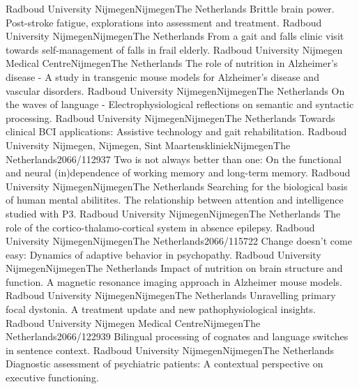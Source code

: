 	{Radboud University Nijmegen}{Nijmegen}{The Netherlands}{}
	{Brittle brain power. Post-stroke fatigue, explorations into assessment and treatment.}
	{Radboud University Nijmegen}{Nijmegen}{The Netherlands}{}
	{From a gait and falls clinic visit towards self-management of falls in frail elderly.}
	{Radboud University Nijmegen Medical Centre}{Nijmegen}{The Netherlands}{}
	{The role of nutrition in Alzheimer's disease - A study in transgenic mouse models for Alzheimer's disease and vascular disorders.}
	{Radboud University Nijmegen}{Nijmegen}{The Netherlands}{}
	{On the waves of language - Electrophysiological reflections on semantic and syntactic processing.}
	{Radboud University Nijmegen}{Nijmegen}{The Netherlands}{}
	{Towards clinical BCI applications: Assistive technology and gait rehabilitation.}
	{Radboud University Nijmegen, Nijmegen, Sint Maartenskliniek}{Nijmegen}{The Netherlands}{2066/112937}
	{Two is not always better than one: On the functional and neural (in)dependence of working memory and long-term memory.}
	{Radboud University Nijmegen}{Nijmegen}{The Netherlands}{}
	{Searching for the biological basis of human mental abilitites. The relationship between attention and intelligence studied with P3.}
	{Radboud University Nijmegen}{Nijmegen}{The Netherlands}{}
	{The role of the cortico-thalamo-cortical system in absence epilepsy.}
	{Radboud University Nijmegen}{Nijmegen}{The Netherlands}{2066/115722}
	{Change doesn’t come easy: Dynamics of adaptive behavior in psychopathy.}
	{Radboud University Nijmegen}{Nijmegen}{The Netherlands}{}
	{ Impact of nutrition on brain structure and function. A magnetic resonance imaging approach in Alzheimer mouse models.}
	{Radboud University Nijmegen}{Nijmegen}{The Netherlands}{}
	{Unravelling primary focal dystonia. A treatment update and new pathophysiological insights.}
	{Radboud University Nijmegen Medical Centre}{Nijmegen}{The Netherlands}{2066/122939}
	{Bilingual processing of cognates and language switches in sentence context.}
	{Radboud University Nijmegen}{Nijmegen}{The Netherlands}{}
	{Diagnostic assessment of psychiatric patients: A contextual perspective on executive functioning.}
